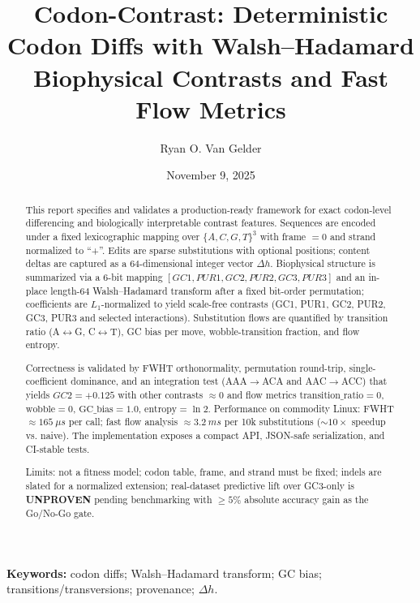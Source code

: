 \documentclass[11pt]{article}
\title{Codon-Contrast: Deterministic Codon Diffs with Walsh--Hadamard Biophysical Contrasts and Fast Flow Metrics}
\author{Ryan O. Van Gelder}
\date{November 9, 2025}
\begin{document}
\maketitle

\begin{abstract}
This report specifies and validates a production-ready framework for exact codon-level differencing and biologically interpretable contrast features. Sequences are encoded under a fixed lexicographic mapping over \(\{A,C,G,T\}^3\) with frame \(=0\) and strand normalized to “+”. Edits are sparse substitutions with optional positions; content deltas are captured as a 64-dimensional integer vector \(\Delta h\). Biophysical structure is summarized via a 6-bit mapping \([GC1, PUR1, GC2, PUR2, GC3, PUR3]\) and an in-place length-64 Walsh--Hadamard transform after a fixed bit-order permutation; coefficients are \(L_1\)-normalized to yield scale-free contrasts (GC1, PUR1, GC2, PUR2, GC3, PUR3 and selected interactions). Substitution flows are quantified by transition ratio (A\(\leftrightarrow\)G, C\(\leftrightarrow\)T), GC bias per move, wobble-transition fraction, and flow entropy.

Correctness is validated by FWHT orthonormality, permutation round-trip, single-coefficient dominance, and an integration test (AAA\(\rightarrow\)ACA and AAC\(\rightarrow\)ACC) that yields \(GC2=+0.125\) with other contrasts \(\approx 0\) and flow metrics \(\text{transition\_ratio}=0\), \(\text{wobble}=0\), \(\text{GC\_bias}=1.0\), \(\text{entropy}=\ln 2\). Performance on commodity Linux: FWHT \(\approx 165~\mu s\) per call; fast flow analysis \(\approx 3.2~ms\) per 10k substitutions (\(\sim 10\times\) speedup vs. naive). The implementation exposes a compact API, JSON-safe serialization, and CI-stable tests.

Limits: not a fitness model; codon table, frame, and strand must be fixed; indels are slated for a normalized extension; real-dataset predictive lift over GC3-only is \textbf{UNPROVEN} pending benchmarking with \(\ge 5\%\) absolute accuracy gain as the Go/No-Go gate.
\end{abstract}

\noindent\textbf{Keywords:} codon diffs; Walsh--Hadamard transform; GC bias; transitions/transversions; provenance; \(\Delta h\).
\end{document}
